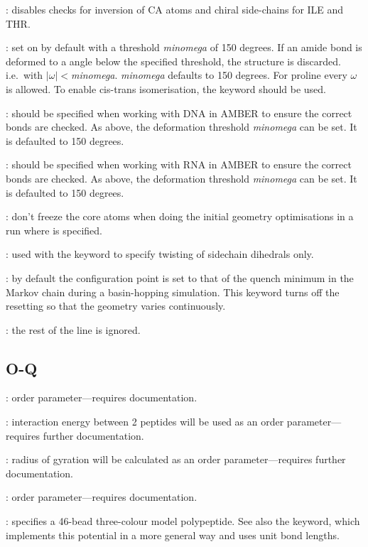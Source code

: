 : disables checks for inversion of CA atoms and chiral side-chains for ILE and THR.

: set on by default with a threshold {\it minomega} of 150 degrees.  
If an amide bond is deformed to a angle below the specified threshold, the structure is discarded. 
i.e.~with $|\omega|<${\it minomega}. {\it minomega\/} defaults to 150 degrees. 
For proline every $\omega$ is allowed. To enable cis-trans isomerisation, the {} keyword should be used. 

: should be specified when working with DNA in AMBER to ensure the correct bonds are 
checked. As above, the deformation threshold {\it minomega} can be set. It is defaulted to 150 degrees.

: should be specified when working with RNA in AMBER to ensure the correct bonds are 
checked. As above, the deformation threshold {\it minomega} can be set. It is defaulted to 150 degrees.

: don't freeze the core atoms when doing the initial geometry optimisations in 
a run where {\/} is specified.

: used with the {} keyword to specify twisting of 
sidechain dihedrals only.

: by default the configuration point is set to that of the
quench minimum in the Markov chain during a basin-hopping simulation. This
keyword turns off the resetting so that the geometry varies continuously.

: the rest of the line is ignored.

\subsection{O-Q}
: order parameter---requires documentation.

: interaction energy between 2 peptides will be used as an order parameter---requires 
further documentation.

: radius of gyration will be calculated as an order parameter---requires 
further documentation.

: order parameter---requires documentation.

: specifies a 46-bead three-colour model polypeptide.
See also the {} keyword, which implements this potential in a more
general way and uses unit bond lengths.

